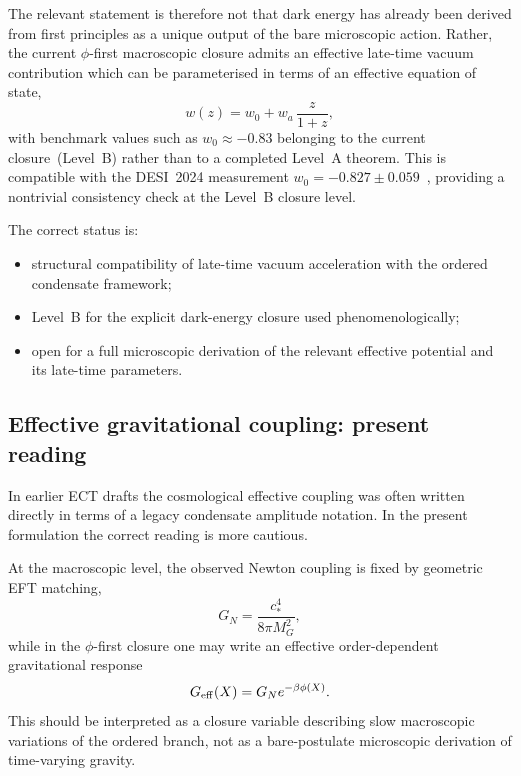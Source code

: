 \documentclass[11pt,a4paper]{article}
\numberwithin{equation}{section}
\begin{document}
The relevant statement is therefore not that dark energy has already
been derived from first principles as a unique output of the bare
microscopic action.
Rather, the current $\phi$-first macroscopic closure admits an
effective late-time vacuum contribution which can be parameterised in
terms of an effective equation of state,
\begin{equation}
  w(z)=w_0+w_a\,\frac{z}{1+z},
\end{equation}
with benchmark values such as $w_0\approx -0.83$ belonging to the
current closure~(Level~B) rather than to a completed Level~A theorem.
This is compatible with the DESI~2024 measurement
$w_0 = -0.827 \pm 0.059$~\cite{DESI2024}, providing a nontrivial
consistency check at the Level~B closure level.

The correct status is:
\begin{itemize}
  \item structural compatibility of late-time vacuum acceleration with
  the ordered condensate framework;
  \item Level~B for the explicit dark-energy closure used
  phenomenologically;
  \item open for a full microscopic derivation of the relevant
  effective potential and its late-time parameters.
\end{itemize}


\subsection{Effective gravitational coupling: present reading}
\label{app:cosmo:geff}

In earlier ECT drafts the cosmological effective coupling was often
written directly in terms of a legacy condensate amplitude notation.
In the present formulation the correct reading is more cautious.

At the macroscopic level, the observed Newton coupling is fixed by
geometric EFT matching,
\begin{equation}
  G_N=\frac{c_*^4}{8\pi M_G^2},
\end{equation}
while in the $\phi$-first closure one may write an effective
order-dependent gravitational response
\begin{equation}
  G_{\rm eff}(X)=G_N e^{-\beta\phi(X)}.
\end{equation}
This should be interpreted as a closure variable describing slow
macroscopic variations of the ordered branch, not as a bare-postulate
microscopic derivation of time-varying gravity.
\end{document}
